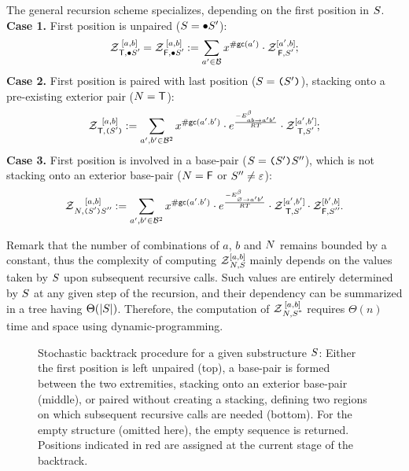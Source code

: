 The general recursion scheme specializes, depending on the first position in $\Struct$.\\
{\bf Case 1.} First position is unpaired ($\Struct = \ub \Struct'$):
\begin{equation}
	\Z{\BoolTrue,\ub \Struct'}{a,b} = \Z{\BoolFalse,\ub \Struct'}{a,b}  :=
      \sum_{a'\in \B}  
      x^{\gc(a')}
      \cdot\Z{\BoolFalse,\Struct'}{a',b}; 
\label{eq:Z_unpaired}
\end{equation}
{\bf Case 2.} First position is paired with last position ($\Struct = \op \Struct' \cp$), stacking onto a pre-existing exterior pair ($\N=\BoolTrue$):
\begin{equation}
	\Z{\BoolTrue,\op \Struct' \cp}{a,b} :=
      \sum_{a',b'\in \B^2}
			 x^{\gc(a'.b')}
			 \cdot e^{\frac{-\ES^{\beta}_{ab \to a'b'}}{RT}}
			 \cdot \Z{\BoolTrue,\Struct'}{a',b'};
\label{eq:Z_stack}
\end{equation}
{\bf Case 3.} First position is involved in a base-pair ($\Struct = \op \Struct' \cp \Struct''$), which is not stacking onto an exterior base-pair ($\N=\BoolFalse$ or $\Struct''\neq \varepsilon$):
\begin{equation}
	\Z{\N,\op \Struct' \cp \Struct''}{a,b} :=
			 \displaystyle
      \sum_{a',b'\in \B^2}
      x^{\gc(a'.b')}
			\cdot e^{\frac{-\ES^{\beta}_{\varnothing\to a'b'}}{RT}}
      \cdot\Z{\BoolTrue,\Struct'}{a',b'}
      \cdot\Z{\BoolFalse,\Struct''}{b',b}.
\label{eq:Z_rec}
\end{equation}

Remark that the number of combinations of $a$, $b$ and $\N$ remains bounded by a constant, thus the complexity of computing $\Z{\N,\Struct}{a,b}$ mainly depends on the values taken by $\Struct$ upon subsequent recursive calls. Such values are entirely determined by $\Struct$ at any given step of the recursion, and their dependency can be summarized in a tree having $\Theta(|\Struct|)$. Therefore, the computation of $\Z{\N,\Target}{a,b}$ requires $\Theta(n)$ time and space using dynamic-programming.

\begin{figure*}
\resizebox{\linewidth}{!}{}
\caption{Stochastic backtrack procedure for a given substructure $\Struct$: Either the first position is left unpaired (top), a base-pair is formed between the two extremities, stacking onto an exterior base-pair (middle), or paired without creating a stacking, defining two regions on which subsequent recursive calls are needed (bottom). For the empty structure (omitted here), the empty sequence is returned. Positions indicated in red are assigned at the current stage of the backtrack.\label{fig:stochastic}}
\end{figure*}

